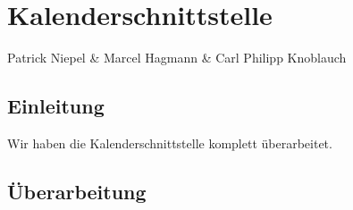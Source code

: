 \chapter{Kalenderschnittstelle}
Patrick Niepel \& Marcel Hagmann \& Carl Philipp Knoblauch

\section{Einleitung}
Wir haben die Kalenderschnittstelle komplett überarbeitet.

\section{Überarbeitung}


